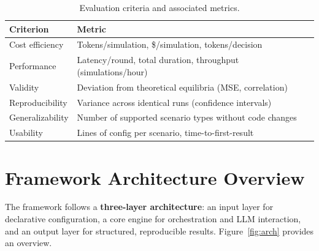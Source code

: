 \documentclass[12pt, a4paper]{article}
\begin{document}
\begin{table}[h!]
    \centering
    \begin{tabularx}{\textwidth}{lX}
        \toprule
        \textbf{Criterion} & \textbf{Metric} \\
        \midrule
        Cost efficiency       & Tokens/simulation, \$/simulation, tokens/decision \\
        Performance           & Latency/round, total duration, throughput (simulations/hour) \\
        Validity              & Deviation from theoretical equilibria (MSE, correlation) \\
        Reproducibility       & Variance across identical runs (confidence intervals) \\
        Generalizability      & Number of supported scenario types without code changes \\
        Usability             & Lines of config per scenario, time-to-first-result \\
        \bottomrule
    \end{tabularx}
    \caption{Evaluation criteria and associated metrics.}
    \label{tab:eval}
\end{table}

\section{Framework Architecture Overview}
\label{sec:architecture}

The framework follows a \textbf{three-layer architecture}: an input layer for declarative configuration, a core engine for orchestration and LLM interaction, and an output layer for structured, reproducible results. Figure~\ref{fig:arch} provides an overview.
\end{document}
